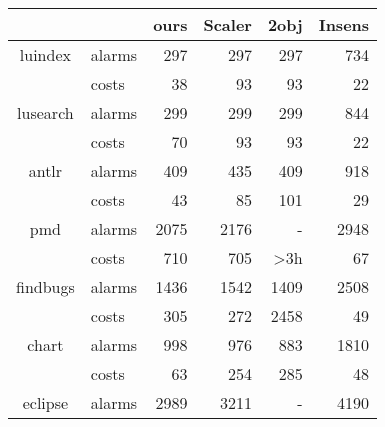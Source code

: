 \begin{table}[]
	\begin{tabular}{clrrrr}
		\toprule
		&        & \multicolumn{1}{c}{ours} & \multicolumn{1}{c}{Scaler} & \multicolumn{1}{c}{2obj} & \multicolumn{1}{c}{Insens} \\ \midrule
		luindex  & alarms & 297                      & 297                        & 297                      & 734                        \\
		& costs  & 38                       & 93                         & 93                       & 22                         \\ \midrule
		lusearch & alarms & 299                      & 299                        & 299                      & 844                        \\
		& costs  & 70                       & 93                         & 93                       & 22                         \\\midrule
		antlr    & alarms & 409                      & 435                           & 409                      & 918                        \\
		& costs  & 43                       &         85                   & 101                      & 29                         \\\midrule
		pmd      & alarms &  2075                        & 2176                       & -                         & 2948                       \\
		& costs  & 710                       & 705                        & >3h                       & 67                         \\\midrule
		findbugs & alarms & 1436                         & 1542                       & 1409                     & 2508                       \\
		& costs  & 305                         & 272                        & 2458                     & 49                         \\\midrule
		chart    & alarms & 998                      & 976                        & 883                      & 1810                       \\
		& costs  & 63                       & 254                        & 285                      & 48                         \\\midrule
		eclipse  & alarms &  2989                        & 3211                       &  -                        & 4190                       \\

\end{tabular}
\end{table}
